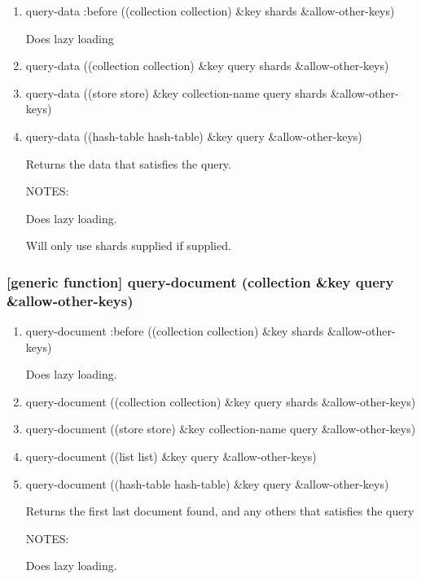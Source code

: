 \documentclass[11pt]{article}
\begin{document}
\begin{enumerate}
\item query-data :before ((collection collection) \&key shards \&allow-other-keys)
\label{sec:orgab1f2fe}

Does lazy loading

\item query-data ((collection collection) \&key query shards \&allow-other-keys)
\label{sec:orgc078534}

\item query-data ((store store) \&key collection-name query shards \&allow-other-keys)
\label{sec:orgf6e51e8}

\item query-data ((hash-table hash-table) \&key query \&allow-other-keys)
\label{sec:org41c64db}

Returns the data that satisfies the query.

NOTES:

Does lazy loading.

Will only use shards supplied if supplied.
\end{enumerate}

\subsubsection{[generic function] query-document (collection \&key query \&allow-other-keys)}
\label{sec:org18dddd2}

\begin{enumerate}
\item query-document :before ((collection collection) \&key shards \&allow-other-keys)
\label{sec:orgbd64d49}

Does lazy loading.

\item query-document ((collection collection) \&key query shards \&allow-other-keys)
\label{sec:org7ad8e5b}

\item query-document ((store store) \&key collection-name query \&allow-other-keys)
\label{sec:org02e8c58}

\item query-document ((list list) \&key query \&allow-other-keys)
\label{sec:org1ef930e}

\item query-document ((hash-table hash-table) \&key query \&allow-other-keys)
\label{sec:orge7f8ae0}

Returns the first last document found, and any others that satisfies
the query

NOTES:

Does lazy loading.
\end{enumerate}
\end{document}
